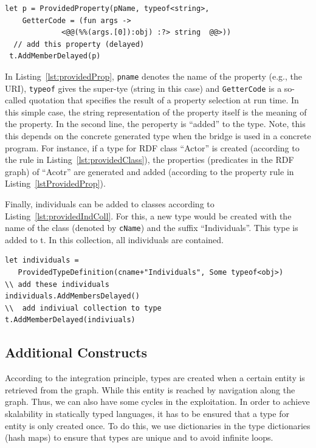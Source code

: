 \documentclass{llncs} %
\begin{document}
\begin{lstlisting}[style=code, caption={\texttt{Property Rule:} Add Property for Class C}, label={lst:providedProp}]
 let p = ProvidedProperty(pName, typeof<string>, 
    GetterCode = (fun args -> 
		     <@@(%%(args.[0]):obj) :?> string  @@>))
  // add this property (delayed)
 t.AddMemberDelayed(p)
 \end{lstlisting}

In Listing~\ref{lst:providedProp}, \texttt{pname} denotes the name of the property (e.g., the URI), \texttt{typeof} gives the
super-tye (string in this case) and \texttt{GetterCode} is a so-called quotation that specifies the result of a property selection at run time.
In this simple case, the string representation of the property itself is the meaning of the property.
In the second line, the peroperty is ``added'' to the type. Note, this this depends on the concrete generated type 
when the bridge is used in a concrete program. For instance, if a type for RDF class ``Actor'' is created (according to the rule in Listing~\ref{lst:providedClass}),
the properties (predicates in the RDF graph) of ``Acotr'' are generated and added (according to the property rule in Listing~\ref{lstProvidedProp}).

Finally, individuals can be added to classes according to Listing~\ref{lst:providedIndColl}.
For this, a new type would be created with the name of the class (denoted by \texttt{cName}) and the
suffix ``Individuals''. This type is added to t. In this collection, all individuals are contained.

\begin{lstlisting}[style=code, caption={\texttt{Individual Rule:} Add Individuals (set / collection) to Class C}, label={lst:providedIndColl}]
let individuals = 
   ProvidedTypeDefinition(cname+"Individuals", Some typeof<obj>)
\\ add these individuals
individuals.AddMembersDelayed()
\\  add indiviual collection to type 
t.AddMemberDelayed(indiviuals)
 \end{lstlisting}


\subsection{Additional Constructs}

According to the integration principle, types are created when a certain entity is retrieved from the graph. While this entity is reached
by navigation along the graph. Thus, we can also have some cycles in the exploitation. In order to achieve skalability in
statically typed languages, it has to be ensured that a type for entity is only created once.
To do this, we use dictionaries in the type dictionaries (hash maps) to ensure that types are unique and to avoid infinite loops.
\end{document}
